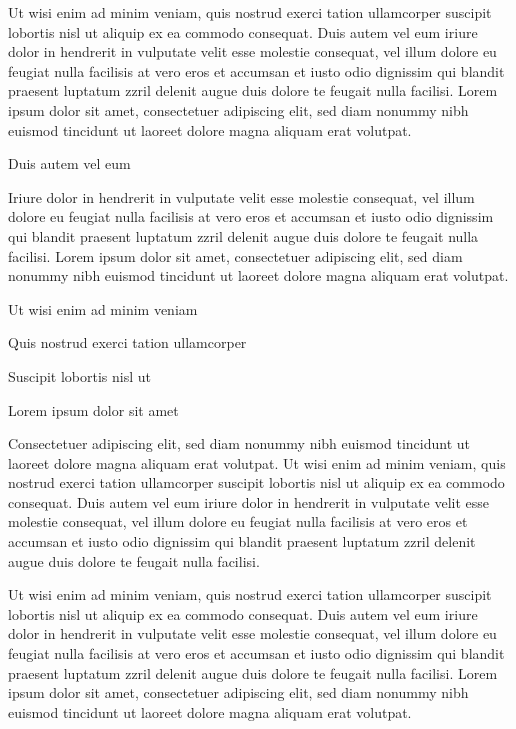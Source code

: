 \documentclass[11pt,twoside]{article}\makeatletter
\begin{document}
Ut wisi enim ad minim veniam, quis nostrud exerci tation       ullamcorper suscipit lobortis nisl ut aliquip ex ea commodo       consequat. Duis autem vel eum iriure dolor in hendrerit in vulputate       velit esse molestie consequat, vel illum dolore eu feugiat nulla       facilisis at vero eros et accumsan et iusto odio dignissim qui blandit       praesent luptatum zzril delenit augue duis dolore te feugait nulla       facilisi. Lorem ipsum dolor sit amet, consectetuer adipiscing elit,       sed diam nonummy nibh euismod tincidunt ut laoreet dolore magna       aliquam erat volutpat. \par
Duis autem vel eum \par
Iriure dolor in hendrerit in vulputate velit esse molestie       consequat, vel illum dolore eu feugiat nulla facilisis at vero eros et       accumsan et iusto odio dignissim qui blandit praesent luptatum zzril       delenit augue duis dolore te feugait nulla facilisi. Lorem ipsum dolor       sit amet, consectetuer adipiscing elit, sed diam nonummy nibh euismod       tincidunt ut laoreet dolore magna aliquam erat volutpat. \par
Ut wisi enim ad minim veniam\par
Quis nostrud exerci tation ullamcorper \par
Suscipit lobortis nisl ut \par
Lorem ipsum dolor sit amet\par
Consectetuer adipiscing elit, sed diam nonummy nibh euismod       tincidunt ut laoreet dolore magna aliquam erat volutpat. Ut wisi enim       ad minim veniam, quis nostrud exerci tation ullamcorper suscipit       lobortis nisl ut aliquip ex ea commodo consequat. Duis autem vel eum       iriure dolor in hendrerit in vulputate velit esse molestie consequat,       vel illum dolore eu feugiat nulla facilisis at vero eros et accumsan       et iusto odio dignissim qui blandit praesent luptatum zzril delenit       augue duis dolore te feugait nulla facilisi.\par
Ut wisi enim ad minim veniam, quis nostrud exerci tation       ullamcorper suscipit lobortis nisl ut aliquip ex ea commodo       consequat. Duis autem vel eum iriure dolor in hendrerit in vulputate       velit esse molestie consequat, vel illum dolore eu feugiat nulla       facilisis at vero eros et accumsan et iusto odio dignissim qui blandit       praesent luptatum zzril delenit augue duis dolore te feugait nulla       facilisi. Lorem ipsum dolor sit amet, consectetuer adipiscing elit,       sed diam nonummy nibh euismod tincidunt ut laoreet dolore magna       aliquam erat volutpat. \par
\end{document}
